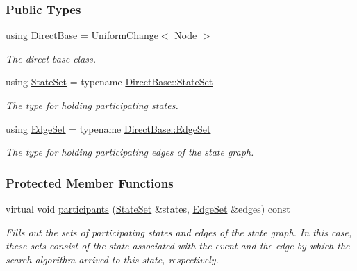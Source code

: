 \subsubsection*{Public Types}
\begin{DoxyCompactItemize}
\item 
using \hyperlink{structVertexEdgeChange_ab66be57732c14cf2580365a4f7f2bd28}{Direct\+Base} = \hyperlink{structUniformChange}{Uniform\+Change}$<$ Node $>$\hypertarget{structVertexEdgeChange_ab66be57732c14cf2580365a4f7f2bd28}{}\label{structVertexEdgeChange_ab66be57732c14cf2580365a4f7f2bd28}

\begin{DoxyCompactList}\small\item\em The direct base class. \end{DoxyCompactList}\item 
using \hyperlink{structVertexEdgeChange_a67eef315b21cfa81fdb92280ed529ea2}{State\+Set} = typename \hyperlink{structUniformChange_afc89af5d5e897d7664eb9ae7770d145c}{Direct\+Base\+::\+State\+Set}\hypertarget{structVertexEdgeChange_a67eef315b21cfa81fdb92280ed529ea2}{}\label{structVertexEdgeChange_a67eef315b21cfa81fdb92280ed529ea2}

\begin{DoxyCompactList}\small\item\em The type for holding participating states. \end{DoxyCompactList}\item 
using \hyperlink{structVertexEdgeChange_a8dd16f5fa3044ccb636ea6432ec5cd83}{Edge\+Set} = typename \hyperlink{structUniformChange_a2afec8b1a5887f2c6fad054d6b739fc5}{Direct\+Base\+::\+Edge\+Set}\hypertarget{structVertexEdgeChange_a8dd16f5fa3044ccb636ea6432ec5cd83}{}\label{structVertexEdgeChange_a8dd16f5fa3044ccb636ea6432ec5cd83}

\begin{DoxyCompactList}\small\item\em The type for holding participating edges of the state graph. \end{DoxyCompactList}\end{DoxyCompactItemize}
\subsubsection*{Protected Member Functions}
\begin{DoxyCompactItemize}
\item 
virtual void \hyperlink{structVertexEdgeChange_ad8dcad41b2d4e273c7fadaa4ff857ed3}{participants} (\hyperlink{structUniformChange_afc89af5d5e897d7664eb9ae7770d145c}{State\+Set} \&states, \hyperlink{structUniformChange_a2afec8b1a5887f2c6fad054d6b739fc5}{Edge\+Set} \&edges) const 
\begin{DoxyCompactList}\small\item\em Fills out the sets of participating states and edges of the state graph. In this case, these sets consist of the state associated with the event and the edge by which the search algorithm arrived to this state, respectively. \end{DoxyCompactList}\end{DoxyCompactItemize}
